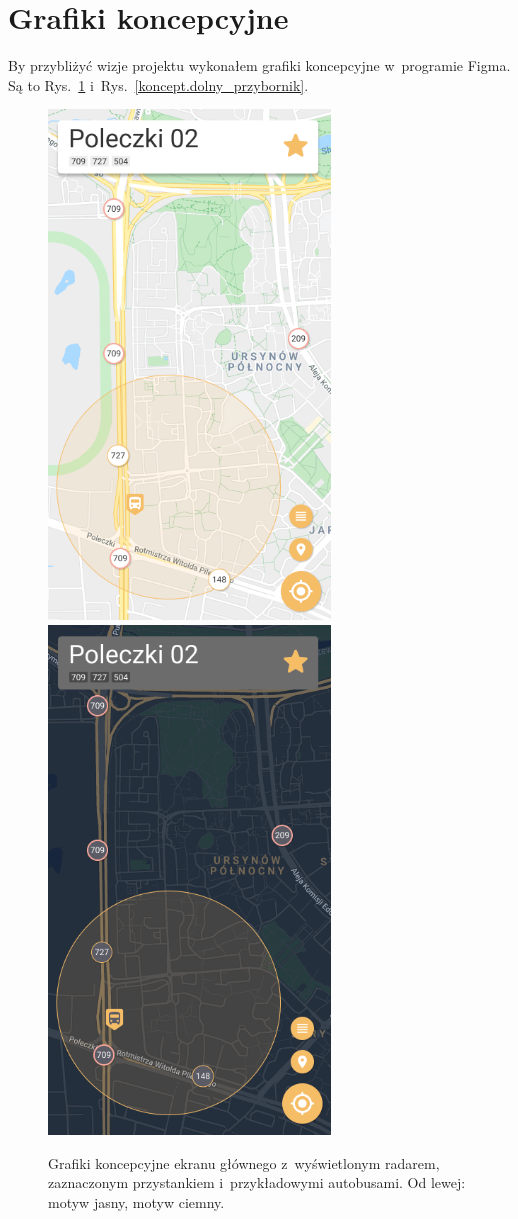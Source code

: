 \documentclass{SGGW-thesis}
\begin{document}
\section{Grafiki koncepcyjne}
By przybliżyć wizje projektu wykonałem grafiki koncepcyjne w~programie Figma.
Są to Rys.~\ref{koncept.ekran_glowny} i~Rys.~\ref{koncept.dolny_przybornik}.
\begin{figure}[!htb]
  \centering
  \includegraphics[width=75mm]{koncepty/screen_day_click_stop}
  \enspace
  \includegraphics[width=75mm]{koncepty/screen_night_click_stop}
  \caption[Ekran główny - koncept]{
    \label{koncept.ekran_glowny}
    Grafiki koncepcyjne ekranu głównego z~wyświetlonym radarem, zaznaczonym przystankiem i~przykładowymi autobusami. Od lewej: motyw jasny, motyw ciemny. \vspace{2ex}
  }
\end{figure}
\end{document}
